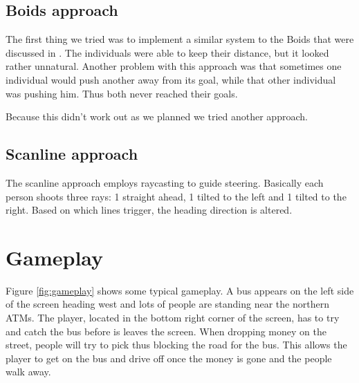 \documentclass[a4paper,pdf,12pt]{article}
\begin{document}
\subsection{Boids approach}
The first thing we tried was to implement a similar system to the Boids that were discussed in \citep{reynolds1987flocks}. The individuals were able to keep their distance, but it looked rather unnatural. Another problem with this approach was that sometimes one individual would push another away from its goal, while that other individual was pushing him. Thus both never reached their goals.

Because this didn't work out as we planned we tried another approach.

\subsection{Scanline approach}
The scanline approach employs raycasting to guide steering. Basically each person shoots three rays: 1 straight ahead, 1 tilted to the left and 1 tilted to the right. Based on which lines trigger, the heading direction is altered.

\section{Gameplay}
\label{sec:Gameplay}
Figure \ref{fig:gameplay} shows some typical gameplay. A bus appears on the left side of the screen heading west and lots of people are standing near the northern ATMs. The player, located in the bottom right corner of the screen, has to try and catch the bus before is leaves the screen. When dropping money on the street, people will try to pick thus blocking the road for the bus. This allows the player to get on the bus and drive off once the money is gone and the people walk away.
\end{document}
